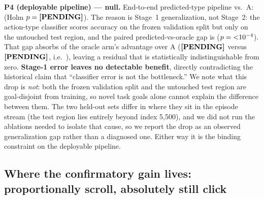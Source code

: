 \textbf{P4 (deployable pipeline) --- null.} End-to-end predicted-type
pipeline vs.\ A: \ConfEtoEvsA{} (Holm $p=\textbf{[PENDING]}$). The reason is
Stage~1 generalization, not Stage~2: the action-type classifier scores
\ConfStageOneValAcc{} accuracy on the frozen validation split but only
\ConfStageOneAcc{} on the untouched test region, and the paired
predicted-vs-oracle gap is \ConfEtoEGap{} ($p={<}10^{-4}$). That gap
absorbs \ConfEtoEGapShare{} of the oracle arm's advantage over A
($\textbf{[PENDING]}$ versus $\textbf{[PENDING]}$, i.e.\ \ConfEtoEOracleAdv{}), leaving
a residual that is statistically indistinguishable from zero.
\textbf{Stage-1 error leaves no detectable benefit}, directly contradicting
the historical claim that ``classifier error is not the bottleneck.''
We note what this drop is \emph{not}: both the frozen validation split and
the untouched test region are goal-disjoint from training, so novel task
goals alone cannot explain the difference between them. The two held-out
sets differ in where they sit in the episode stream (the test region lies
entirely beyond index 5{,}500), and we did not run the ablations needed to
isolate that cause, so we report the drop as an observed generalization gap
rather than a diagnosed one. Either way it is the binding constraint on the
deployable pipeline.

\subsection{Where the confirmatory gain lives: proportionally scroll,
absolutely still click}
\label{sec:confperclass}

\newcommand{\tabconfperclassfloat}{%
\begin{table}[tb]
\begin{center}\small
\fittab{}
\end{center}
\caption{Confirmatory per-class hit@0.10 on the untouched test set
(seed-averaged; parse failures counted as misses, so denominators are the
fixed class counts in the header). C, D-hook and D-token receive the
ground-truth action type at inference; A and B do not. The oracle
conditioning gain is proportionally largest on
\emph{scroll} (A \ConfAscroll{} $\to$ D-hook \ConfDhscroll{}, a $\ConfScrollFold\times$
relative improvement) and modest on \emph{click}
(\ConfAclick{} $\to$ \ConfDhclick{}). The auxiliary loss (B) improves click
slightly while \emph{harming} scroll. \emph{type} remains exactly $0.000$
for every variant: AITW type coordinates are degenerate.}
\label{tab:confperclass}
\end{table}}
\ifworkshopbuild\else\tabconfperclassfloat\fi

